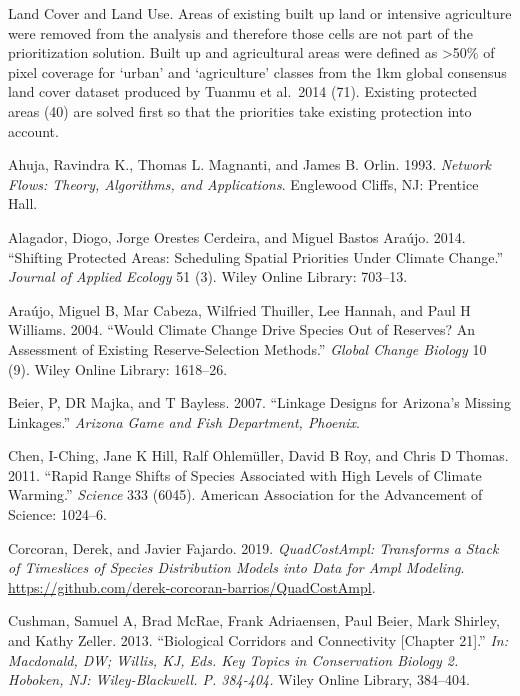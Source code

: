 \documentclass[]{article}
\begin{document}
Land Cover and Land Use. Areas of existing built up land or intensive agriculture were removed from the analysis and therefore those cells are not part of the prioritization solution. Built up and agricultural areas were defined as \textgreater{}50\% of pixel coverage for `urban' and `agriculture' classes from the 1km global consensus land cover dataset produced by Tuanmu et al.~2014 (71). Existing protected areas (40) are solved first so that the priorities take existing protection into account.

\hypertarget{refs}{}
\leavevmode\hypertarget{ref-Ahuja93}{}%
Ahuja, Ravindra K., Thomas L. Magnanti, and James B. Orlin. 1993. \emph{Network Flows: Theory, Algorithms, and Applications}. Englewood Cliffs, NJ: Prentice Hall.

\leavevmode\hypertarget{ref-alagador2014shifting}{}%
Alagador, Diogo, Jorge Orestes Cerdeira, and Miguel Bastos Araújo. 2014. ``Shifting Protected Areas: Scheduling Spatial Priorities Under Climate Change.'' \emph{Journal of Applied Ecology} 51 (3). Wiley Online Library: 703--13.

\leavevmode\hypertarget{ref-araujo2004would}{}%
Araújo, Miguel B, Mar Cabeza, Wilfried Thuiller, Lee Hannah, and Paul H Williams. 2004. ``Would Climate Change Drive Species Out of Reserves? An Assessment of Existing Reserve-Selection Methods.'' \emph{Global Change Biology} 10 (9). Wiley Online Library: 1618--26.

\leavevmode\hypertarget{ref-beier2007linkage}{}%
Beier, P, DR Majka, and T Bayless. 2007. ``Linkage Designs for Arizona's Missing Linkages.'' \emph{Arizona Game and Fish Department, Phoenix}.

\leavevmode\hypertarget{ref-chen2011rapid}{}%
Chen, I-Ching, Jane K Hill, Ralf Ohlemüller, David B Roy, and Chris D Thomas. 2011. ``Rapid Range Shifts of Species Associated with High Levels of Climate Warming.'' \emph{Science} 333 (6045). American Association for the Advancement of Science: 1024--6.

\leavevmode\hypertarget{ref-Corcoran_Quadcost}{}%
Corcoran, Derek, and Javier Fajardo. 2019. \emph{QuadCostAmpl: Transforms a Stack of Timeslices of Species Distribution Models into Data for Ampl Modeling}. \url{https://github.com/derek-corcoran-barrios/QuadCostAmpl}.

\leavevmode\hypertarget{ref-cushman2013biological}{}%
Cushman, Samuel A, Brad McRae, Frank Adriaensen, Paul Beier, Mark Shirley, and Kathy Zeller. 2013. ``Biological Corridors and Connectivity {[}Chapter 21{]}.'' \emph{In: Macdonald, DW; Willis, KJ, Eds. Key Topics in Conservation Biology 2. Hoboken, NJ: Wiley-Blackwell. P. 384-404.} Wiley Online Library, 384--404.
\end{document}
